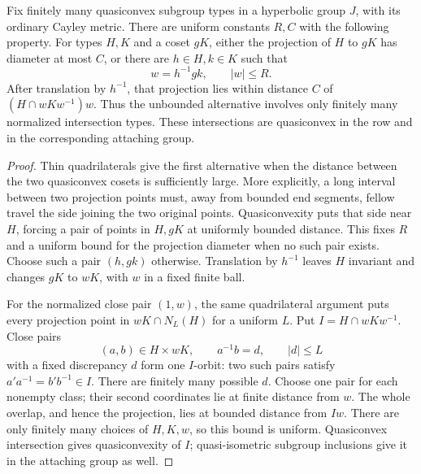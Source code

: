 \begin{lemma}
\label{transfer:coset-projection}
Fix finitely many quasiconvex subgroup types in a hyperbolic group
$J$, with its ordinary Cayley metric. There are uniform constants
$R,C$ with the following property. For types $H,K$ and a coset $gK$,
either the projection of $H$ to $gK$ has diameter at most $C$, or
there are $h\in H,k\in K$ such that
\[
 w=h^{-1}gk,\qquad |w|\le R.
\]
After translation by $h^{-1}$, that projection lies within distance
$C$ of $(H\cap wKw^{-1})w$. Thus the unbounded alternative involves
only finitely many normalized intersection types. These intersections
are quasiconvex in the row and in the corresponding attaching group.
\end{lemma}
\begin{proof}
Thin quadrilaterals give the first alternative when the distance
between the two quasiconvex cosets is sufficiently large. More
explicitly, a long interval between two projection points must,
away from bounded end segments, fellow travel the side joining the
two original points. Quasiconvexity puts that side near $H$, forcing
a pair of points in $H,gK$ at uniformly bounded distance. This fixes
$R$ and a uniform bound for the projection diameter when no such
pair exists. Choose such a pair $(h,gk)$ otherwise. Translation by
$h^{-1}$ leaves $H$ invariant and changes $gK$ to $wK$, with $w$
in a fixed finite ball.

For the normalized close pair $(1,w)$, the same quadrilateral
argument puts every projection point in $wK\cap N_L(H)$ for a
uniform $L$. Put $I=H\cap wKw^{-1}$. Close pairs
\[
 (a,b)\in H\times wK,\qquad a^{-1}b=d,\qquad |d|\le L
\]
with a fixed discrepancy $d$ form one $I$-orbit: two such pairs
satisfy $a'a^{-1}=b'b^{-1}\in I$. There are finitely many possible
$d$. Choose one pair for each nonempty class; their second
coordinates lie at finite distance from $w$. The whole overlap,
and hence the projection, lies at bounded distance from $Iw$.
There are only finitely many choices of $H,K,w$, so this bound is
uniform. Quasiconvex intersection gives quasiconvexity of $I$;
quasi-isometric subgroup inclusions give it in the attaching group
as well.
\end{proof}

